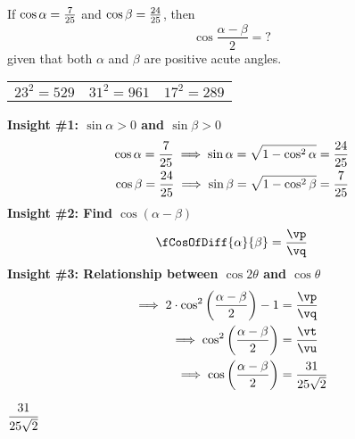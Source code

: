 

\FRACMULT\va\vc\vb\vc\vm\vn
\FRACMULT\vm{}\vp\vq
\FRACADD\vp{}\vr\vs
\FRACDIV\vr{}\vt\vu

\question[3] If $\cos\alpha = \frac{7}{25}$ and $\cos\beta = \frac{24}{25}$, then 
\[ \cos\dfrac{\alpha-\beta}{2} = ? \] 
given that both $\alpha$ and $\beta$ are positive acute angles.

\watchout 

\begin{calcaid}
  \begin{tabular}{c c c} 
    $23^2=529$ & $31^2=961$ & $17^2=289$
  \end{tabular}
\end{calcaid}

\begin{solution}[\halfpage]
   \textbf{Insight \#1: $\sin\alpha>0$ and $\sin\beta>0$}
	\begin{align}
	   \cos\alpha = \dfrac{7}{25} \implies \sin\alpha = \sqrt{1-\cos^2\alpha} &= \dfrac{24}{25} \\
	   \cos\beta = \dfrac{24}{25} \implies \sin\beta = \sqrt{1-\cos^2\beta} &= \dfrac{7}{25} \\
   \end{align}
   \textbf{Insight \#2: Find $\cos(\alpha - \beta)$}
   \[ \fCosOfDiff{\alpha}{\beta} = \dfrac\vp\vq \] 
   \textbf{Insight \#3: Relationship between $\cos 2\theta$ and $\cos\theta$} 
   \begin{align}
	   \implies 2\cdot\cos^2\left( \dfrac{\alpha-\beta}{2}\right) - 1 &= \dfrac\vp\vq  \\
     \implies\cos^2\left(\dfrac{\alpha-\beta}{2}\right) &= \dfrac\vt\vu \\
     \implies\cos\left( \dfrac{\alpha-\beta}{2}\right) &= \ve
   \end{align}

\end{solution}
\ifprintanswers\begin{codex}$\dfrac{31}{25\sqrt{2}}$\end{codex}\fi
